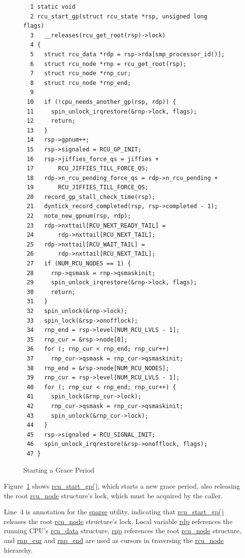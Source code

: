 \begin{figure}[tbp]
{ \scriptsize
\begin{verbatim}
  1 static void
  2 rcu_start_gp(struct rcu_state *rsp, unsigned long flags)
  3   __releases(rcu_get_root(rsp)->lock)
  4 {
  5   struct rcu_data *rdp = rsp->rda[smp_processor_id()];
  6   struct rcu_node *rnp = rcu_get_root(rsp);
  7   struct rcu_node *rnp_cur;
  8   struct rcu_node *rnp_end;
  9 
 10   if (!cpu_needs_another_gp(rsp, rdp)) {
 11     spin_unlock_irqrestore(&rnp->lock, flags);
 12     return;
 13   }
 14   rsp->gpnum++;
 15   rsp->signaled = RCU_GP_INIT;
 16   rsp->jiffies_force_qs = jiffies +
 17       RCU_JIFFIES_TILL_FORCE_QS;
 18   rdp->n_rcu_pending_force_qs = rdp->n_rcu_pending +
 19       RCU_JIFFIES_TILL_FORCE_QS;
 20   record_gp_stall_check_time(rsp);
 21   dyntick_record_completed(rsp, rsp->completed - 1);
 22   note_new_gpnum(rsp, rdp);
 23   rdp->nxttail[RCU_NEXT_READY_TAIL] =
 24       rdp->nxttail[RCU_NEXT_TAIL];
 25   rdp->nxttail[RCU_WAIT_TAIL] =
 26       rdp->nxttail[RCU_NEXT_TAIL];
 27   if (NUM_RCU_NODES == 1) {
 28     rnp->qsmask = rnp->qsmaskinit;
 29     spin_unlock_irqrestore(&rnp->lock, flags);
 30     return;
 31   }
 32   spin_unlock(&rnp->lock);
 33   spin_lock(&rsp->onofflock);
 34   rnp_end = rsp->level[NUM_RCU_LVLS - 1];
 35   rnp_cur = &rsp->node[0];
 36   for (; rnp_cur < rnp_end; rnp_cur++)
 37     rnp_cur->qsmask = rnp_cur->qsmaskinit;
 38   rnp_end = &rsp->node[NUM_RCU_NODES];
 39   rnp_cur = rsp->level[NUM_RCU_LVLS - 1];
 40   for (; rnp_cur < rnp_end; rnp_cur++) {
 41     spin_lock(&rnp_cur->lock);
 42     rnp_cur->qsmask = rnp_cur->qsmaskinit;
 43     spin_unlock(&rnp_cur->lock);
 44   }
 45   rsp->signaled = RCU_SIGNAL_INIT;
 46   spin_unlock_irqrestore(&rsp->onofflock, flags);
 47 }
\end{verbatim}
}
\caption{Starting a Grace Period}
\label{fig:app:rcuimpl:rcutreewt:Starting a Grace Period}
\end{figure}

Figure~\ref{fig:app:rcuimpl:rcutreewt:Starting a Grace Period}
shows \url{rcu_start_gp()}, which starts a new grace period,
also releasing the root \url{rcu_node} structure's lock, which
must be acquired by the caller.

Line~4 is annotation for the \url{sparse} utility, indicating
that \url{rcu_start_gp()} releases the root \url{rcu_node}
structure's lock.
Local variable \url{rdp} references the running CPU's \url{rcu_data}
structure, \url{rnp} references the root \url{rcu_node} structure,
and \url{rnp_cur} and \url{rnp_end} are used as cursors in traversing
the \url{rcu_node} hierarchy.

